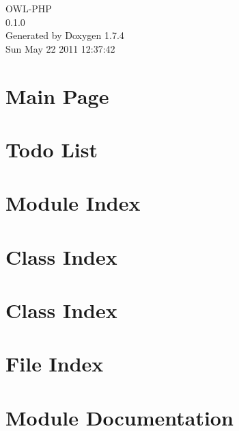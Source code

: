 \documentclass[a4paper]{book}
\begin{document}
\begin{titlepage}
\vspace*{7cm}
\begin{center}
{\Large OWL-\/PHP \\[1ex]\large 0.1.0 }\\
\vspace*{1cm}
{\large Generated by Doxygen 1.7.4}\\
\vspace*{0.5cm}
{\small Sun May 22 2011 12:37:42}\\
\end{center}
\end{titlepage}
\clearemptydoublepage
{}
\tableofcontents
\clearemptydoublepage
{}
\chapter{Main Page}
\label{index}
\chapter{Todo List}
\label{todo}

\chapter{Module Index}

\chapter{Class Index}

\chapter{Class Index}

\chapter{File Index}

\chapter{Module Documentation}



























\end{document}
